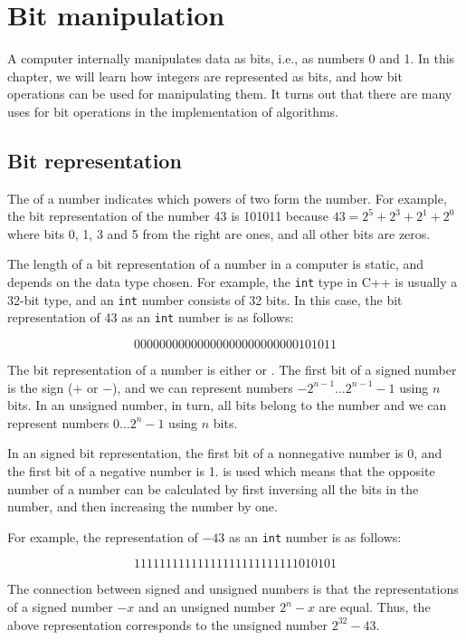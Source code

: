 \chapter{Bit manipulation}

A computer internally manipulates data
as bits, i.e., as numbers 0 and 1.
In this chapter, we will learn how integers
are represented as bits, and how bit operations
can be used for manipulating them.
It turns out that there are many uses for
bit operations in the implementation of algorithms.

\section{Bit representation}


The  of a number
indicates which powers of two form the number.
For example, the bit representation of the number 43
is 101011 because
$43 = 2^5 + 2^3 + 2^1 + 2^0$ where
bits 0, 1, 3 and 5 from the right are ones,
and all other bits are zeros.

The length of a bit representation of a number
in a computer is static, and depends on the
data type chosen.
For example, the \texttt{int} type in C++ is
usually a 32-bit type, and an \texttt{int} number
consists of 32 bits.
In this case, the bit representation of 43
as an \texttt{int} number is as follows:

\[00000000000000000000000000101011\]

The bit representation of a number is either
 or .
The first bit of a signed number is the sign
($+$ or $-$), and we can represent numbers
$-2^{n-1} \ldots 2^{n-1}-1$ using $n$ bits.
In an unsigned number, in turn,
all bits belong to the number and we
can represent numbers $0 \ldots 2^n-1$ using $n$ bits.

In an signed bit representation,
the first bit of a nonnegative number is 0,
and the first bit of a negative number is 1.
 is used which means that
the opposite number of a number can be calculated
by first inversing all the bits in the number,
and then increasing the number by one.

For example, the representation of $-43$
as an \texttt{int} number is as follows:

\[11111111111111111111111111010101\]

The connection between signed and unsigned numbers
is that the representations of a signed
number $-x$ and an unsigned number $2^n-x$
are equal.
Thus, the above representation corresponds to
the unsigned number $2^{32}-43$.

